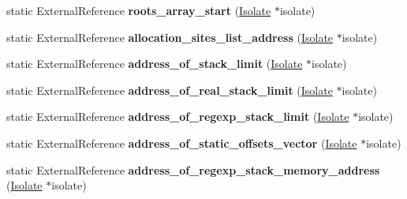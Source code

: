 \begin{DoxyCompactItemize}
\item 
static External\+Reference {\bfseries roots\+\_\+array\+\_\+start} (\hyperlink{classv8_1_1internal_1_1_isolate}{Isolate} $\ast$isolate)\hypertarget{classv8_1_1internal_1_1_b_a_s_e___e_m_b_e_d_d_e_d_af06394efd2b57ccca170419c8c0fec19}{}\label{classv8_1_1internal_1_1_b_a_s_e___e_m_b_e_d_d_e_d_af06394efd2b57ccca170419c8c0fec19}

\item 
static External\+Reference {\bfseries allocation\+\_\+sites\+\_\+list\+\_\+address} (\hyperlink{classv8_1_1internal_1_1_isolate}{Isolate} $\ast$isolate)\hypertarget{classv8_1_1internal_1_1_b_a_s_e___e_m_b_e_d_d_e_d_a10085241e4260a3b5ceb88b973496240}{}\label{classv8_1_1internal_1_1_b_a_s_e___e_m_b_e_d_d_e_d_a10085241e4260a3b5ceb88b973496240}

\item 
static External\+Reference {\bfseries address\+\_\+of\+\_\+stack\+\_\+limit} (\hyperlink{classv8_1_1internal_1_1_isolate}{Isolate} $\ast$isolate)\hypertarget{classv8_1_1internal_1_1_b_a_s_e___e_m_b_e_d_d_e_d_aa8de6bdb621e6187b569d5da0c90b394}{}\label{classv8_1_1internal_1_1_b_a_s_e___e_m_b_e_d_d_e_d_aa8de6bdb621e6187b569d5da0c90b394}

\item 
static External\+Reference {\bfseries address\+\_\+of\+\_\+real\+\_\+stack\+\_\+limit} (\hyperlink{classv8_1_1internal_1_1_isolate}{Isolate} $\ast$isolate)\hypertarget{classv8_1_1internal_1_1_b_a_s_e___e_m_b_e_d_d_e_d_a0413f110fff927332a97d3c59954824c}{}\label{classv8_1_1internal_1_1_b_a_s_e___e_m_b_e_d_d_e_d_a0413f110fff927332a97d3c59954824c}

\item 
static External\+Reference {\bfseries address\+\_\+of\+\_\+regexp\+\_\+stack\+\_\+limit} (\hyperlink{classv8_1_1internal_1_1_isolate}{Isolate} $\ast$isolate)\hypertarget{classv8_1_1internal_1_1_b_a_s_e___e_m_b_e_d_d_e_d_a777b69c9f1298b02cfac7e210903d3f1}{}\label{classv8_1_1internal_1_1_b_a_s_e___e_m_b_e_d_d_e_d_a777b69c9f1298b02cfac7e210903d3f1}

\item 
static External\+Reference {\bfseries address\+\_\+of\+\_\+static\+\_\+offsets\+\_\+vector} (\hyperlink{classv8_1_1internal_1_1_isolate}{Isolate} $\ast$isolate)\hypertarget{classv8_1_1internal_1_1_b_a_s_e___e_m_b_e_d_d_e_d_ac23839dc84f32e3a1ed23cede04adf96}{}\label{classv8_1_1internal_1_1_b_a_s_e___e_m_b_e_d_d_e_d_ac23839dc84f32e3a1ed23cede04adf96}

\item 
static External\+Reference {\bfseries address\+\_\+of\+\_\+regexp\+\_\+stack\+\_\+memory\+\_\+address} (\hyperlink{classv8_1_1internal_1_1_isolate}{Isolate} $\ast$isolate)\hypertarget{classv8_1_1internal_1_1_b_a_s_e___e_m_b_e_d_d_e_d_a6a2b98aa962d41e870e434092fe9c6a2}{}\label{classv8_1_1internal_1_1_b_a_s_e___e_m_b_e_d_d_e_d_a6a2b98aa962d41e870e434092fe9c6a2}


\end{DoxyCompactItemize}
